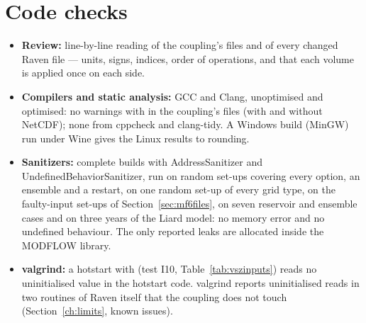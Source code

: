 \section{Code checks}\label{sec:codeaudit}\label{sec:sanitizer}
\begin{itemize}
\item \textbf{Review:} line-by-line reading of the coupling's files and of every changed Raven file --- units, signs,
indices, order of operations, and that each volume is applied once on each side.
\item \textbf{Compilers and static analysis:} GCC and Clang, unoptimised and optimised: no warnings with  in the coupling's files (with and without NetCDF); none from cppcheck and clang-tidy. A Windows build (MinGW) run
under Wine gives the Linux results to rounding.
\item \textbf{Sanitizers:} complete builds with AddressSanitizer and UndefinedBehaviorSanitizer, run on random set-ups covering
every option, an ensemble and a restart, on one random set-up of every grid type, on the faulty-input set-ups of
Section~\ref{sec:mf6files}, on seven reservoir and ensemble cases and on three years of the Liard model: no memory error and
no undefined behaviour. The only reported leaks are allocated inside the MODFLOW library.
\item \textbf{valgrind:} a hotstart with  (test I10, Table~\ref{tab:vszinputs}) reads no uninitialised value
in the hotstart code. valgrind reports uninitialised reads in two routines of Raven itself that the coupling does not touch
(Section~\ref{ch:limits}, known issues).
\end{itemize}

